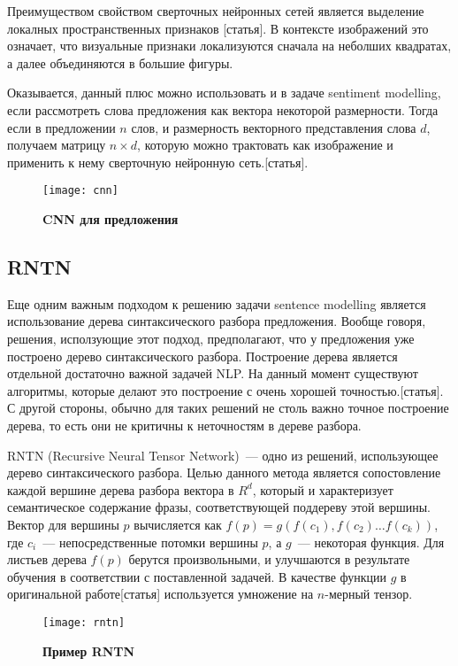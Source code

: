 Преимуществом свойством сверточных нейронных сетей является выделение локалных пространственных признаков [статья]. В контексте изображений это означает, что визуальные признаки локализуются сначала на неболших квадратах, а далее объединяются в большие фигуры.

Оказывается, данный плюс можно использовать и в задаче sentiment modelling, если рассмотреть слова предложения как вектора некоторой размерности. Тогда если в предложении $n$ слов, 
и размерность векторного представления слова $d$, получаем матрицу $n \times d$, 
которую можно трактовать как изображение и применить к нему сверточную нейронную сеть.[статья].

\begin{figure}[h]
\texttt{[image: cnn]}
\caption{\textbf{CNN для предложения}}
\label{fig:cnn}
\end{figure}

\subsection{RNTN}
Еще одним важным подходом к решению задачи sentence modelling является использование 
дерева синтаксического разбора предложения. Вообще говоря, решения, исползующие этот подход, предполагают, что у предложения уже построено дерево синтаксического разбора. Построение дерева является отдельной достаточно важной задачей NLP. На данный момент существуют алгоритмы, которые делают это построение с очень хорошей точностью.[статья]. 
С другой стороны, обычно для таких решений не столь важно точное построение дерева, то есть они не критичны к неточностям в дереве разбора.

RNTN (Recursive Neural Tensor Network)~--- одно из решений, использующее дерево синтаксического разбора. Целью данного метода является сопостовление каждой вершине дерева разбора вектора в $R^d$, который и характеризует семантическое содержание фразы, соответствующей поддереву этой вершины.
Вектор для вершины $p$ вычисляется как $f(p)=g(f(c_1), f(c_2) \dots{} f(c_k))$, где $c_i$~--- непосредственные потомки вершины $p$, а $g$~--- некоторая функция. Для листьев дерева $f(p)$ берутся произвольными, и улучшаются в результате обучения в соответствии с поставленной задачей.
В качестве функции $g$ в оригинальной работе[статья] используется умножение на $n$-мерный тензор.

\begin{figure}[h]
\texttt{[image: rntn]}
\caption{\textbf{Пример RNTN}}
\label{fig:rntn}
\end{figure}
 